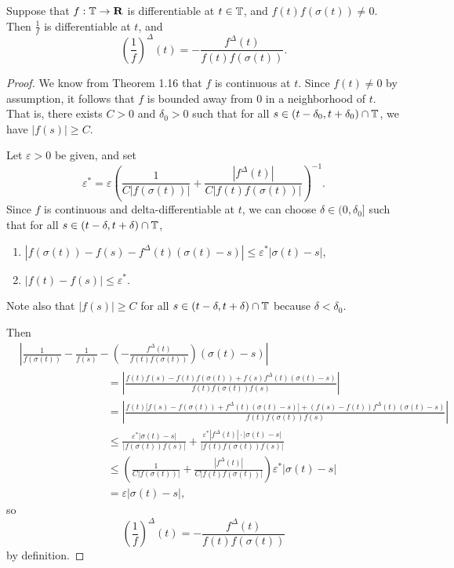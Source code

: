 \documentclass{homework}
\begin{document}
	Suppose that $f : \mathbb{T} \to \textnormal{\bf R}$ is differentiable at $t \in \mathbb{T}$, and $f(t)f(\sigma(t)) \ne 0$. Then $\frac{1}{f}$ is differentiable at $t$, and
	\begin{equation*}
		\left(\frac{1}{f}\right)^\Delta(t) = -\frac{f^\Delta(t)}{f(t)f(\sigma(t))}.
	\end{equation*}
	\begin{proof}
		We know from Theorem 1.16 that $f$ is continuous at $t$. Since $f(t) \ne 0$ by assumption, it follows that $f$ is bounded away from 0 in a neighborhood of $t$. That is, there exists $C > 0$ and $\delta_0 > 0$ such that for all $s \in (t-\delta_0, t+\delta_0)\cap \mathbb{T}$, we have $|f(s)| \ge C$.
		
		Let $\varepsilon > 0$ be given, and set 
		\begin{equation*}
			\varepsilon^*= \varepsilon\left(\frac{1}{C|f(\sigma(t))|} + \frac{\left|f^\Delta(t)\right|}{C\big|f(t)f(\sigma(t))\big|}\right)^{-1}.
		\end{equation*}
		Since $f$ is continuous and delta-differentiable at $t$, we can choose $\delta  \in (0, \delta_0]$ such that for all $s \in (t-\delta, t+\delta) \cap \mathbb{T}$,
		\begin{enumerate}
			\item $|f(\sigma(t)) - f(s) - f^\Delta(t)(\sigma(t) - s)| \le \varepsilon^* |\sigma(t) - s|$,
			\item $|f(t) - f(s)| \le \varepsilon^*$.
		\end{enumerate}
		Note also that $|f(s)| \ge C$ for all $s \in (t-\delta, t+\delta)\cap\mathbb{T}$ because $\delta < \delta_0$.
		
		Then
		\begin{align*}
			&\left|\frac{1}{f(\sigma(t))} - \frac{1}{f(s)} - \left(-\frac{f^\Delta(t)}{f(t)f(\sigma(t))}\right)(\sigma(t) - s)\right|\\[0.5em]
			&\qquad\qquad\qquad\qquad= \left|\frac{f(t)f(s) - f(t)f(\sigma(t)) + f(s)f^\Delta(t)(\sigma(t)-s)}{f(t)f(\sigma(t))f(s)}\right| \\[0.5em]
			&\qquad\qquad\qquad\qquad= \left|\frac{f(t)\big[f(s) - f(\sigma(t)) + f^\Delta(t)(\sigma(t)-s)\big] + (f(s) - f(t))f^\Delta(t)(\sigma(t) - s)}{f(t)f(\sigma(t))f(s)}\right| \\[0.5em]
			&\qquad\qquad\qquad\qquad \le \frac{\varepsilon^*|\sigma(t)-s|}{\big|f(\sigma(t))f(s)|} + \frac{\varepsilon^*\left|f^\Delta(t)\right|\cdot|\sigma(t)-s|}{\big|f(t)f(\sigma(t))f(s)\big|} \\[0.5em]
			&\qquad\qquad\qquad\qquad \le \left(\frac{1}{C|f(\sigma(t))|} + \frac{\left|f^\Delta(t)\right|}{C\big|f(t)f(\sigma(t))\big|}\right)\varepsilon^*|\sigma(t)-s| \\[0.5em]
			&\qquad\qquad\qquad\qquad = \varepsilon|\sigma(t)-s|,
		\end{align*}
		so
		\begin{equation*}
			\left(\frac{1}{f}\right)^\Delta(t) = -\frac{f^\Delta(t)}{f(t)f(\sigma(t))}
		\end{equation*}
		by definition.
	\end{proof}
	
	
\end{document}
